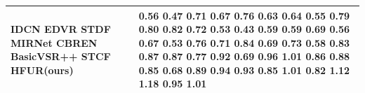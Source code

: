 \begin{tabular}{ll}
\toprule
IDCN EDVR STDF MIRNet CBREN BasicVSR++ STCF HFUR(ours) & 0.56 0.47 0.71 0.67 0.76 0.63 0.64 0.55 0.79 0.80 0.82 0.72 0.53 0.43 0.59 0.59 0.69 0.56 0.67 0.53 0.76 0.71 0.84 0.69 0.73 0.58 0.83 0.87 0.87 0.77 0.92 0.69 0.96 1.01 0.86 0.88 0.85 0.68 0.89 0.94 0.93 0.85 1.01 0.82 1.12 1.18 0.95 1.01 \\
\midrule
\bottomrule
\end{tabular}
